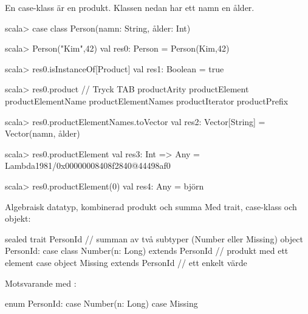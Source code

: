 \begin{Slide}{En case-klass är en produkt.}
Klassen  nedan har ett namn  en ålder.
\begin{REPL}
scala> case class Person(namn: String, ålder: Int)

scala> Person("Kim",42)
val res0: Person = Person(Kim,42)

scala> res0.isInstanceOf[Product]
val res1: Boolean = true

scala> res0.product   // Tryck TAB
productArity          productElement    productElementName
productElementNames   productIterator   productPrefix
          
scala> res0.productElementNames.toVector
val res2: Vector[String] = Vector(namn, ålder)

scala> res0.productElement
val res3: Int => Any = Lambda1981/0x00000008408f2840@44498af0

scala> res0.productElement(0)
val res4: Any = björn

\end{REPL} 
\end{Slide}


\begin{Slide}{Algebraisk datatyp, kombinerad produkt och summa}\SlideFontSmall
Med trait, case-klass och objekt:
\begin{Code}
sealed trait PersonId // summan av två subtyper (Number eller Missing)
object PersonId:  
  case class Number(n: Long) extends PersonId  // produkt med ett element
  case object Missing extends PersonId         // ett enkelt värde
\end{Code}
\pause Motsvarande med :
\begin{Code}
enum PersonId:
  case Number(n: Long)
  case Missing     
\end{Code}

\end{Slide}

